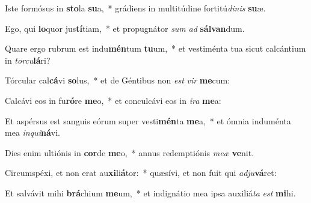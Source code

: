 \item Iste formósus in \textbf{sto}la \textbf{su}a,~* grádiens in multitúdine fortitú\textit{di}\textit{nis} \textbf{su}æ.
\item Ego, qui \textbf{lo}quor jus\textbf{tí}tiam,~* et propugnátor \textit{sum} \textit{ad} \textbf{sál}\textbf{van}dum.
\item Quare ergo rubrum est indu\textbf{mén}tum \textbf{tu}um,~* et vestiménta tua sicut calcántium in \textit{tor}\textit{cu}\textbf{lá}ri?
\item Tórcular cal\textbf{cá}vi \textbf{so}lus,~* et de Géntibus non \textit{est} \textit{vir} \textbf{me}cum:
\item Calcávi eos in fu\textbf{ró}re \textbf{me}o,~* et conculcávi eos in \textit{i}\textit{ra} \textbf{me}a:
\item Et aspérsus est sanguis eórum super vesti\textbf{mén}ta \textbf{me}a,~* et ómnia induménta mea \textit{in}\textit{qui}\textbf{ná}vi.
\item Dies enim ultiónis in \textbf{cor}de \textbf{me}o,~* annus redemptiónis \textit{me}\textit{æ} \textbf{ve}nit.
\item Circumspéxi, et non erat au\textbf{xi}li\textbf{á}tor:~* quæsívi, et non fuit qui \textit{ad}\textit{ju}\textbf{vá}ret:
\item Et salvávit mihi \textbf{brá}chium \textbf{me}um,~* et indignátio mea ipsa auxiliá\textit{ta} \textit{est} \textbf{mi}hi.
